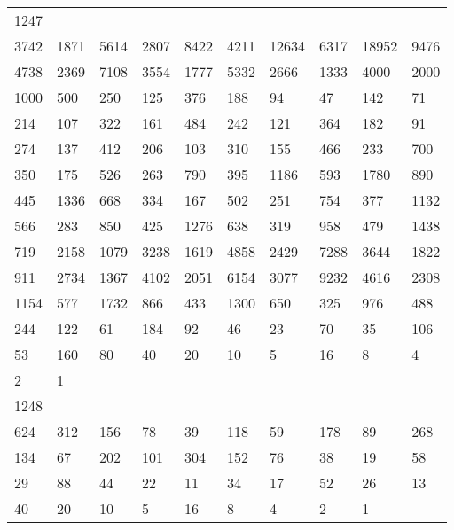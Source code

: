 \begin{longtable}{*{10}{l}}
1247&&&&&&&&&\\
3742& 1871& 5614& 2807& 8422& 4211& 12634& 6317& 18952& 9476\\
4738& 2369& 7108& 3554& 1777& 5332& 2666& 1333& 4000& 2000\\
1000& 500& 250& 125& 376& 188& 94& 47& 142& 71\\
214& 107& 322& 161& 484& 242& 121& 364& 182& 91\\
274& 137& 412& 206& 103& 310& 155& 466& 233& 700\\
350& 175& 526& 263& 790& 395& 1186& 593& 1780& 890\\
445& 1336& 668& 334& 167& 502& 251& 754& 377& 1132\\
566& 283& 850& 425& 1276& 638& 319& 958& 479& 1438\\
719& 2158& 1079& 3238& 1619& 4858& 2429& 7288& 3644& 1822\\
911& 2734& 1367& 4102& 2051& 6154& 3077& 9232& 4616& 2308\\
1154& 577& 1732& 866& 433& 1300& 650& 325& 976& 488\\
244& 122& 61& 184& 92& 46& 23& 70& 35& 106\\
53& 160& 80& 40& 20& 10& 5& 16& 8& 4\\
2& 1& \\

1248&&&&&&&&&\\
624& 312& 156& 78& 39& 118& 59& 178& 89& 268\\
134& 67& 202& 101& 304& 152& 76& 38& 19& 58\\
29& 88& 44& 22& 11& 34& 17& 52& 26& 13\\
40& 20& 10& 5& 16& 8& 4& 2& 1& \\


\end{longtable}
